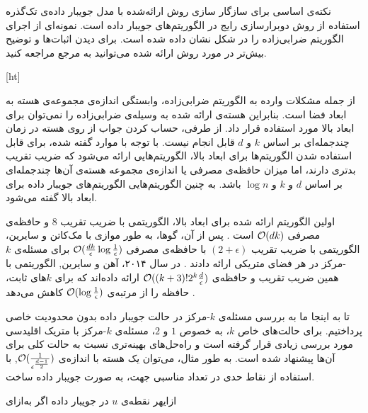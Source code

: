 نکته‌ی اساسی برای سازگار سازی روش ارائه‌شده با مدل جویبار داده‌ی تک‌گذره استفاده از روش دوبرارسازی رایج در الگوریتم‌های جویبار داده است.
نمونه‌ای از اجرای الگوریتم ضرابی‌زاده را در شکل  نشان داده شده است.
برای دیدن اثبات‌ها و توضیح بیش‌تر در مورد روش ارائه شده می‌توانید به مرجع  مراجعه کنید.

[ht]

از جمله مشکلات وارده به الگوریتم ضرابی‌زاده، وابستگی اندازه‌ی مجموعه‌ی هسته به ابعاد فضا است.
بنابراین هسته‌ی ارائه شده به وسیله‌ی ضرابی‌زاده را نمی‌توان برای ابعاد بالا مورد استفاده قرار داد.
از طرفی، حساب کردن جواب از روی هسته در زمان چندجمله‌ای بر اساس $k$ و $d$ قابل انجام نیست.
با توجه با موارد گفته شده، برای قابل استفاده شدن الگوریتم‌ها برای ابعاد بالا، الگوریتم‌هایی ارائه می‌شود که ضریب تقریب بدتری دارند، اما میزان حافظه‌ی مصرفی یا اندازه‌ی مجموعه هسته‌ی آن‌ها چندجمله‌ای بر اساس $d$ و $k$ و $\log{n}$ باشد.
به چنین الگوریتم‌هایی الگوریتم‌های جویبار داده برای ابعاد بالا گفته می‌شود. 

اولین الگوریتم ارائه شده برای ابعاد بالا،  الگوریتمی با ضریب تقریب $8$ و حافظه‌ی مصرفی $\mathcal{O}(dk)$ است .
پس از آن، گوها، به طور موازی با مک‌کاتن و سایرین، الگوریتمی با ضریب تقریب $(2+\epsilon)$ با حافظه‌ی مصرفی $\mathcal{O}(\frac{dk}{\epsilon} \log{\frac{1}{\epsilon}})$ برای مسئله‌ی $k$-مرکز در هر فضای متریکی ارائه دادند .
در سال ۲۰۱۴، آهن و سایرین, الگوریتمی با همین ضریب تقریب و حافظه‌ی $\mathcal{O}((k+3)!2^k\frac{d}{\epsilon})$ ارائه داده‌اند که برای $k$‌های ثابت، حافظه را از مرتبه‌ی $\mathcal{O}(\log{\frac{1}{\epsilon}})$ کاهش می‌دهد . 

تا به اینجا ما به بررسی مسئله‌ی $k$-مرکز در حالت جویبار داده بدون محدودیت خاصی پرداختیم.
برای حالت‌های خاص $k$، به خصوص $1$ و $2$، مسئله‌ی $k$-مرکز با متریک اقلیدسی مورد بررسی زیادی قرار گرفته است و راه‌حل‌های بهینه‌تری نسبت به حالت کلی برای آن‌ها پیشنهاد شده است.
به طور مثال، می‌توان یک هسته با اندازه‌ی $\mathcal{O}(\frac{1}{\epsilon^{\frac{d-1}{2}}})$, با استفاده از نقاط حدی در تعداد مناسبی جهت، به صورت جویبار داده ساخت. 

‌ازای{هر نقطه‌ی $u$ در جویبار داده}
‌اگر
‌به‌ازای

